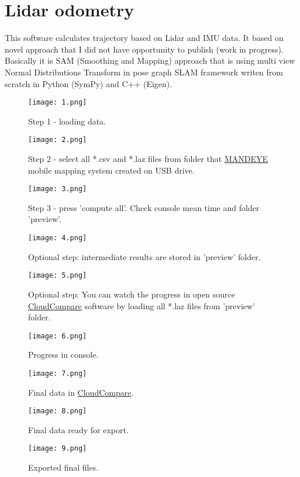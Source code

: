 \chapter{Lidar odometry}
This software calculates trajectory based on Lidar and IMU data.
It based on novel approach that I did not have opportunity to publish (work in progress).
Basically it is SAM (Smoothing and Mapping) approach that is using multi view Normal Distributions Transform in pose graph SLAM framework writen from scratch in Python (SymPy) and C++ (Eigen).
 

\begin{figure}
	\centering
	\texttt{[image: 1.png]}
	\caption{Step 1 - loading data.}
	\label{fig:1}
\end{figure}

\begin{figure}
	\centering
	\texttt{[image: 2.png]}
	\caption{Step 2 - select all *.csv and *.laz files from folder that \href{https://github.com/JanuszBedkowski/mandeye_controller/blob/main/doc/manual/manual_v0_1/mandeye_dev_manual_v0_1.pdf}{MANDEYE} mobile mapping system created on USB drive.}
	\label{fig:2}
\end{figure}

\begin{figure}
	\centering
	\texttt{[image: 3.png]}
	\caption{Step 3 - press 'compute all'. Check console mean time and folder 'preview'.}
	\label{fig:3}
\end{figure}

\begin{figure}
	\centering
	\texttt{[image: 4.png]}
	\caption{Optional step: intermediate results are stored in 'preview' folder.}
	\label{fig:4}
\end{figure}

\begin{figure}
	\centering
	\texttt{[image: 5.png]}
	\caption{Optional step: You can watch the progress in open source \href{https://www.cloudcompare.org/}{CloudCompare} software by loading all *.laz files from 'preview' folder.}
	\label{fig:5}
\end{figure}

\begin{figure}
	\centering
	\texttt{[image: 6.png]}
	\caption{Progress in console.}
	\label{fig:6}
\end{figure}

\begin{figure}
	\centering
	\texttt{[image: 7.png]}
	\caption{Final data in \href{https://www.cloudcompare.org/}{CloudCompare}.}
	\label{fig:7}
\end{figure}

\begin{figure}
	\centering
	\texttt{[image: 8.png]}
	\caption{Final data ready for export.}
	\label{fig:8}
\end{figure}

\begin{figure}
	\centering
	\texttt{[image: 9.png]}
	\caption{Exported final files.}
	\label{fig:9}
\end{figure}